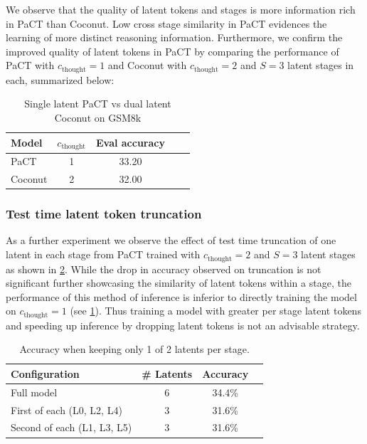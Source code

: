 We observe that the quality of latent tokens and stages is more information rich in PaCT than Coconut. Low cross stage similarity in PaCT evidences the learning of more distinct reasoning information. Furthermore, we confirm the improved quality of latent tokens in PaCT by comparing the performance of PaCT with $c_{\text{thought}}=1$ and Coconut with $c_{\text{thought}}=2$ and $S=3$ latent stages in each, summarized below:

\begin{table}[H]
    \centering
    \small
    \caption{Single latent PaCT vs dual latent Coconut on GSM8k}
    \label{tab:1v2}
    \begin{tabular}{lcccc}
        \toprule
        {Model} & {$c_{\text{thought}}$} &{Eval accuracy}\\
        \midrule
        PaCT & 1 & 33.20 \\
        Coconut & 2 & 32.00 \\
        \bottomrule
    \end{tabular}
\end{table}


\subsubsection{Test time latent token truncation}
As a further experiment we observe the effect of test time truncation of one latent in each stage from PaCT trained with $c_{\text{thought}}=2$ and $S=3$ latent stages as shown in \ref{tab:latent_redundancy}. While the drop in accuracy observed on truncation is not significant further showcasing the similarity of latent tokens within a stage, the performance of this method of inference is inferior to directly training the model on $c_{\text{thought}}=1$ (see \ref{tab:1v2}). Thus training a model with greater per stage latent tokens and speeding up inference by dropping latent tokens is not an advisable strategy.

\begin{table}[H]
    \centering
    \small
    \caption{Accuracy when keeping only 1 of 2 latents per stage.}
    \label{tab:latent_redundancy}
    \begin{tabular}{lccc}
        \toprule
        {Configuration} & {\# Latents} & {Accuracy} \\
        \midrule
        Full model & 6 & 34.4\% \\
        First of each (L0, L2, L4) & 3 & 31.6\% \\
        Second of each (L1, L3, L5) & 3 & 31.6\% \\
        \bottomrule
    \end{tabular}
\end{table}

